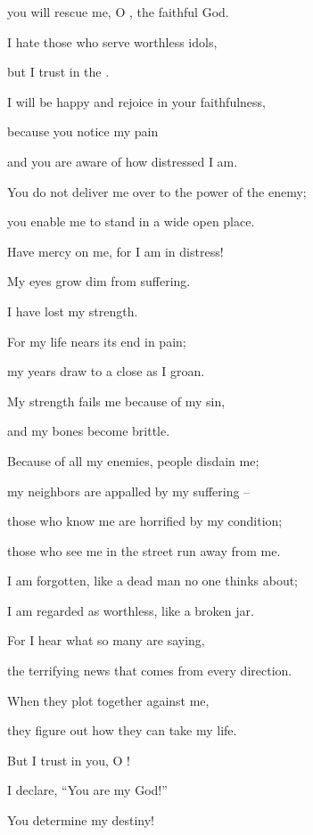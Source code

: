 {\par }{\Q you will rescue
me, O
{}, the faithful
God.
\par }{\Q {}I hate
those who serve
worthless
idols,
\par }{\Q but I
trust
in
the {}.
\par }{\Q {}I will be happy
and rejoice
in your faithfulness,
\par }{\Q because you notice
my pain
\par }{\Q and you are aware
of how distressed I am.
\par }{\Q {}You do not
deliver
me over to the power
of the enemy;
\par }{\Q you enable
me to stand
in a wide open place.
\par }{\Q {}Have mercy
on me, for
I am in distress!
\par }{\Q My eyes
grow dim
from suffering.
\par }{\Q I have lost my strength.
\par }{\Q {}For
my life
nears its end
in pain;
\par }{\Q my years
draw to a close as I groan.
\par }{\Q My strength
fails
me because of my sin,
\par }{\Q and my bones
become brittle.
\par }{\Q {}Because of all
my enemies,
people disdain
me;

\par }{\Q my neighbors
are appalled
by my suffering –
\par }{\Q those who know me are horrified by my condition;
\par }{\Q those who see me in the street run away from me.
\par }{\Q {}I am forgotten,
like a dead
man no one thinks
about;

\par }{\Q I am regarded
as worthless, like a broken
jar.
\par }{\Q {}For
I hear
what so many
are saying,

\par }{\Q the terrifying news
that comes from every direction.
\par }{\Q When they plot
together
against
me,
\par }{\Q they figure out
how they can take
my life.
\par }{\Q {}But I
trust
in you, O
{}!
\par }{\Q I declare,
“You are
my God!”
\par }{\Q {}You determine my
destiny!


}
